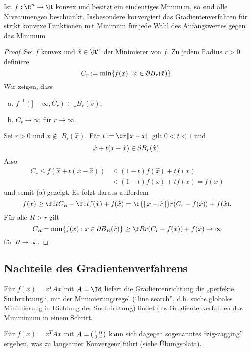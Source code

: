 \begin{st}[Röhm] \label{2.27}
	Ist $f: \R^n \to \R$ konvex und besitzt ein eindeutiges Minimum, so sind alle Niveaumengen beschränkt.
	Insbesondere konvergiert das Gradientenverfahren für strikt konvexe Funktionen mit Minimum für jede Wahl des Anfangswertes gegen das Minimum.
	\begin{proof}
		Sei $f$ konvex und $\hat x \in \R^n$ der Minimierer von $f$.
		Zu jedem Radius $r > 0$ definiere
		\[
			C_r := \min \{ f(x) : x \in \partial B_r (\hat x) \}.
		\]
		Wir zeigen, dass
		\begin{enumerate}[(a)]
			\item
				$f^{-1}(]-\infty, C_r) \subset \_{B_r(\hat x)}$,
			\item
				$C_r \to \infty$ für $r \to \infty$.
		\end{enumerate}
		Sei $r > 0$ und $x \not\in \_{B_r(\hat x)}$.
		Für $t := \f r{\|x - \hat x\|}$ gilt $0 < t < 1$ und
		\[
			\hat x + t(x-\hat x) \in \partial B_r(\hat x).
		\]
		Also
		\begin{align*}
			C_r
			\le f(\hat x + t(x-\hat x))
			&\le (1-t) f(\hat x) + tf(x) \\
			&< (1-t) f(x) + t f(x)
			= f(x)
		\end{align*}
		und somit (a) gezeigt.
		Es folgt daraus außerdem
		\[
			f(x)
			\ge \f 1t C_R - \f 1t f(\hat x) + f(\hat x)
			= \f {\|x-\hat x\|}r (C_r - f(\hat x)) + f(\hat x).
		\]
		Für alle $R > r$ gilt
		\[
			C_R = \min \{ f(x) : x \in \boundary B_R(\hat x) \}
			\ge \f Rr (C_r - f(\hat x)) + f(\hat x)
			\to \infty
		\]
		für $R \to \infty$.
	\end{proof}
\end{st}

\subsection{Nachteile des Gradientenverfahrens}

Für $f(x) = x^T A x$ mit $A = \Id$ liefert die Gradientenrichtung die „perfekte Suchrichtung“, mit der Minimierungsregel (“line search”, d.h. suche globales Minimierung in Richtung der Suchrichtung) findet das Gradientenverfahren das Minimimum in einem Schritt.

Für $f(x) = x^T A x$ mit $A = \begin{psmallmatrix}1 & 0 \\ 0 & 4\end{psmallmatrix}$ kann sich dagegen sogenanntes “zig-zagging” ergeben, was zu langsamer Konvergenz führt (siehe Übungsblatt).


